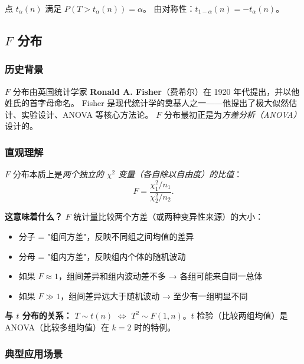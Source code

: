 \begin{definition}
点 $t_{\alpha}(n)$ 满足 $P(T > t_{\alpha}(n)) = \alpha$。
由对称性：$t_{1-\alpha}(n) = -t_{\alpha}(n)$。
\end{definition}

\subsection{$F$ 分布}

\subsubsection{历史背景}

$F$ 分布由英国统计学家 \textbf{Ronald A. Fisher}（费希尔）在 1920 年代提出，并以他姓氏的首字母命名。
Fisher 是现代统计学的奠基人之一——他提出了极大似然估计、实验设计、ANOVA 等核心方法论。
$F$ 分布最初正是为\emph{方差分析（ANOVA）}设计的。

\subsubsection{直观理解}

$F$ 分布本质上是\emph{两个独立的 $\chi^2$ 变量（各自除以自由度）的比值}：
\begin{equation}
    F = \frac{\chi^2_1 / n_1}{\chi^2_2 / n_2}.
\end{equation}

\textbf{这意味着什么？} $F$ 统计量比较两个方差（或两种变异性来源）的大小：
\begin{itemize}
    \item 分子 = "组间方差"，反映不同组之间均值的差异
    \item 分母 = "组内方差"，反映组内个体的随机波动
    \item 如果 $F \approx 1$，组间差异和组内波动差不多 → 各组可能来自同一总体
    \item 如果 $F \gg 1$，组间差异远大于随机波动 → 至少有一组明显不同
\end{itemize}

\textbf{与 $t$ 分布的关系：} $T \sim t(n)$ $\iff$ $T^2 \sim F(1, n)$。$t$ 检验（比较两组均值）是 ANOVA（比较多组均值）在 $k=2$ 时的特例。

\subsubsection{典型应用场景}

